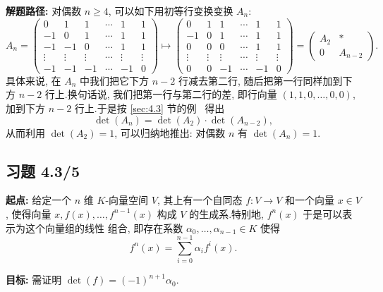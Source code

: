 \noindent\textbf{解题路径:} 对偶数 $n \geq 4$, 可以如下用初等行变换变换 $A_n$:
\[
A_n = \begin{pmatrix} 0 & 1 & 1 & \cdots & 1 & 1 \\ -1 & 0 & 1 & \cdots & 1 & 1 \\ -1 & -1 & 0 & \cdots & 1 & 1 \\ \vdots & \vdots & \vdots & \cdots & \vdots & \vdots \\ -1 & -1 & -1 & \cdots & -1 & 0 \end{pmatrix} \longmapsto \begin{pmatrix} 0 & 1 & 1 & \cdots & 1 & 1 \\ -1 & 0 & 1 & \cdots & 1 & 1 \\ 0 & 0 & 0 & \cdots & 1 & 1 \\ \vdots & \vdots & \vdots & \cdots & \vdots & \vdots \\ 0 & 0 & -1 & \cdots & -1 & 0 \end{pmatrix} = \begin{pmatrix} A_2 & * \\ 0 & A_{n-2} \end{pmatrix}\text{.}
\]
具体来说, 在 $A_n$ 中我们把它下方 $n - 2$ 行减去第二行, 随后把第一行同样加到下方
$n - 2$ 行上.换句话说, 我们把第一行与第二行的差, 即行向量 $(1, 1, 0, \ldots, 0, 0)$,
加到下方 $n - 2$ 行上.于是按 \ref{sec:4.3} 节的例~ 得出
\[
\det(A_n) = \det(A_2) \cdot \det(A_{n-2}),
\]
从而利用 $\det(A_2) = 1$, 可以归纳地推出: 对偶数 $n$ 有 $\det(A_n) = 1$.

\subsection*{习题 4.3/5}

\noindent\textbf{起点:} 给定一个 $n$ 维 $K$-向量空间 $V$, 其上有一个自同态
$f \colon V \longrightarrow V$ 和一个向量 $x \in V$, 使得向量 $x, f(x), \ldots,
f^{n-1}(x)$ 构成 $V$ 的生成系.特别地, $f^n(x)$ 于是可以表示为这个向量组的线性
组合, 即存在系数 $\alpha_0, \ldots, \alpha_{n-1} \in K$ 使得
\[
f^n(x) = \sum_{i=0}^{n-1} \alpha_i f^i(x)\text{.}
\]

\noindent\textbf{目标:} 需证明 $\det(f) = (-1)^{n+1} \alpha_0$.

